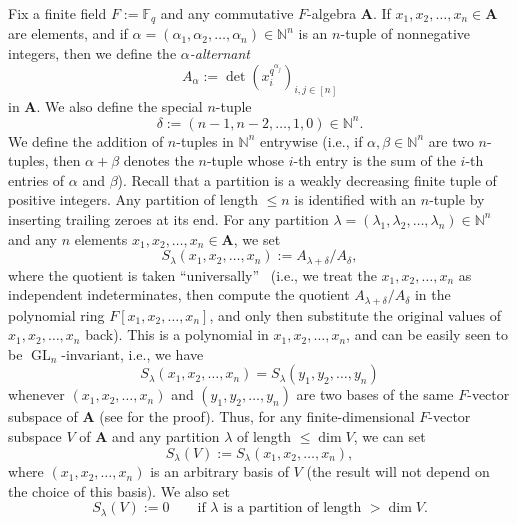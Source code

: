 \documentclass[numbers=enddot,12pt,final,onecolumn,notitlepage]{scrartcl}%
\numberwithin{exer}{section}
\theoremstyle{definition}
\theoremstyle{plainsl}
\begin{document}
Fix a finite field $F:=\mathbb{F}_{q}$ and any commutative $F$-algebra
$\mathbf{A}$. If $x_{1},x_{2},\ldots,x_{n}\in\mathbf{A}$ are elements, and if
$\alpha=\left(  \alpha_{1},\alpha_{2},\ldots,\alpha_{n}\right)  \in
\mathbb{N}^{n}$ is an $n$-tuple of nonnegative integers, then we define the
$\alpha$\emph{-alternant}%
\begin{equation}
A_{\alpha}:=\det\left(  x_{i}^{q^{\alpha_{j}}}\right)  _{i,j\in\left[
n\right]  } \label{eq.Aalpha=}%
\end{equation}
in $\mathbf{A}$. We also define the special $n$-tuple%
\[
\delta:=\left(  n-1,n-2,\ldots,1,0\right)  \in\mathbb{N}^{n}.
\]
We define the addition of $n$-tuples in $\mathbb{N}^{n}$ entrywise (i.e., if
$\alpha,\beta\in\mathbb{N}^{n}$ are two $n$-tuples, then $\alpha+\beta$
denotes the $n$-tuple whose $i$-th entry is the sum of the $i$-th entries of
$\alpha$ and $\beta$). Recall that a partition is a weakly decreasing finite
tuple of positive integers. Any partition of length $\leq n$ is identified
with an $n$-tuple by inserting trailing zeroes at its end. For any partition
$\lambda=\left(  \lambda_{1},\lambda_{2},\ldots,\lambda_{n}\right)
\in\mathbb{N}^{n}$ and any $n$ elements $x_{1},x_{2},\ldots,x_{n}\in
\mathbf{A}$, we set%
\[
S_{\lambda}\left(  x_{1},x_{2},\ldots,x_{n}\right)  :=A_{\lambda+\delta
}/A_{\delta},
\]
where the quotient is taken \textquotedblleft universally\textquotedblright%
\ (i.e., we treat the $x_{1},x_{2},\ldots,x_{n}$ as independent
indeterminates, then compute the quotient $A_{\lambda+\delta}/A_{\delta}$ in
the polynomial ring $F\left[  x_{1},x_{2},\ldots,x_{n}\right]  $, and only
then substitute the original values of $x_{1},x_{2},\ldots,x_{n}$ back). This
is a polynomial in $x_{1},x_{2},\ldots,x_{n}$, and can be easily seen to be
$\operatorname*{GL}\nolimits_{n}$-invariant, i.e., we have%
\begin{equation}
S_{\lambda}\left(  x_{1},x_{2},\ldots,x_{n}\right)  =S_{\lambda}\left(
y_{1},y_{2},\ldots,y_{n}\right)  \label{eq.Slam.GL-inv}%
\end{equation}
whenever $\left(  x_{1},x_{2},\ldots,x_{n}\right)  $ and $\left(  y_{1}%
,y_{2},\ldots,y_{n}\right)  $ are two bases of the same $F$-vector subspace of
$\mathbf{A}$ (see \cite[first paragraph on page 24]{Macdon92} for the proof).
Thus, for any finite-dimensional $F$-vector subspace $V$ of $\mathbf{A}$ and
any partition $\lambda$ of length $\leq\dim V$, we can set%
\begin{equation}
S_{\lambda}\left(  V\right)  :=S_{\lambda}\left(  x_{1},x_{2},\ldots
,x_{n}\right)  , \label{eq.Slam.SlamV1}%
\end{equation}
where $\left(  x_{1},x_{2},\ldots,x_{n}\right)  $ is an arbitrary basis of $V$
(the result will not depend on the choice of this basis). We also set
\begin{equation}
S_{\lambda}\left(  V\right)  :=0\qquad\text{if }\lambda\text{ is a partition
of length }>\dim V. \label{eq.Slam.SlamV0}%
\end{equation}
\end{document}
